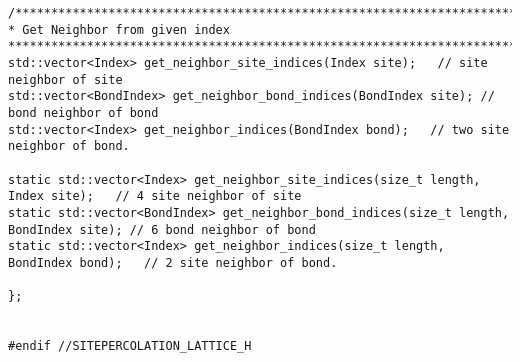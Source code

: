 \begin{lstlisting}[style=CStyle]
/******************************************************************************
* Get Neighbor from given index
******************************************************************************/
std::vector<Index> get_neighbor_site_indices(Index site);   // site neighbor of site
std::vector<BondIndex> get_neighbor_bond_indices(BondIndex site); // bond neighbor of bond
std::vector<Index> get_neighbor_indices(BondIndex bond);   // two site neighbor of bond.

static std::vector<Index> get_neighbor_site_indices(size_t length, Index site);   // 4 site neighbor of site
static std::vector<BondIndex> get_neighbor_bond_indices(size_t length, BondIndex site); // 6 bond neighbor of bond
static std::vector<Index> get_neighbor_indices(size_t length, BondIndex bond);   // 2 site neighbor of bond.

};


#endif //SITEPERCOLATION_LATTICE_H
\end{lstlisting}


